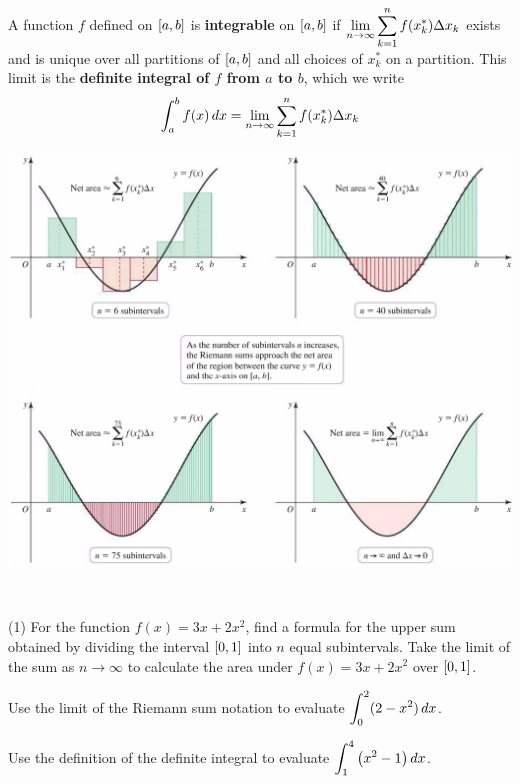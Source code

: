 \documentclass[../mathNotesPreamble]{subfiles}
\begin{document}
\begin{defn*}
  A function $f$ defined on ${\left[a,b\right]}$ is \textbf{integrable} on ${\left[a,b\right]}$ if $\displaystyle\lim_{n\to \infty} \sum_{k=1}^n f(x_k^*)\Delta x_k$ exists and is unique over all partitions of ${\left[a,b\right]}$ and all choices of $x_k^*$ on a partition. This limit is the \textbf{definite integral of $f$ from $a$ to $b$}, which we write
  \[\int_a^b f(x)\,dx=\lim_{n\to \infty}\sum_{k=1}^n f(x_k^*)\Delta x_k\]
\end{defn*}

\begin{center}
  \includegraphics[width=0.85\linewidth]{../images/briggs_05_02/fig5_20.png}
\end{center}
\pagebreak
\begin{ex*}~

  \begin{tasks}[after-item-skip=\stretch{1}](1)
    \task 
      For the function $f(x)=3x+2x^2$, find a formula for the upper sum obtained by dividing the interval ${\left[0,1\right]}$ into $n$ equal subintervals.
    \task 
      Take the limit of the sum as $n\to\infty$ to calculate the area under $f(x)=3x+2x^2$ over ${\left[0,1\right]}$.
  \end{tasks}
\end{ex*}
\pagebreak

\begin{ex*}
  Use the limit of the Riemann sum notation to evaluate $\displaystyle\int_0^2 (2-x^2)\,dx$.
\end{ex*}
\begin{ex*}
  Use the definition of the definite integral to evaluate $\displaystyle\int_1^4 {\left(x^2-1\right)}\,dx$.
\end{ex*}
\pagebreak
\end{document}
